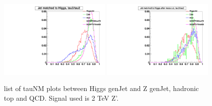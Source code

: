 \begin{figure}[h!tpb]
\begin{center}
\includegraphics[width=0.49\textwidth]{EXO-14-009/HqqqqZqqfigs/tauNM/Tau32Pre.pdf}
\includegraphics[width=0.49\textwidth]{EXO-14-009/HqqqqZqqfigs/tauNM/Tau32After.pdf}
\end{center}
\caption{
list of tauNM plots between Higgs genJet and Z genJet, hadronic top and QCD.
Signal used is 2 TeV Z'.  
}
\label{fig:tauNM1}
\end{figure}

